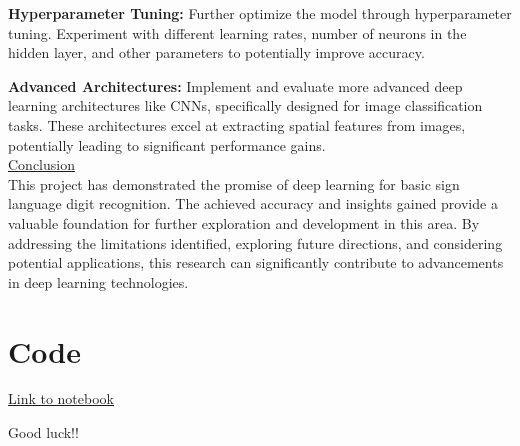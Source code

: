 \documentclass{article}
\begin{document}
\textbf{Hyperparameter Tuning:} Further optimize the model through hyperparameter tuning. Experiment with different learning rates, number of neurons in the hidden layer, and other parameters to potentially improve accuracy.

\textbf{Advanced Architectures:} Implement and evaluate more advanced deep learning architectures like CNNs, specifically designed for image classification tasks. These architectures excel at extracting spatial features from images, potentially leading to significant performance gains. \\


\underline{Conclusion} \\
This project has demonstrated the promise of deep learning for basic sign language digit recognition. The achieved accuracy and insights gained provide a valuable foundation for further exploration and development in this area. By addressing the limitations identified, exploring future directions, and considering potential applications, this research can significantly contribute to advancements in deep learning technologies.

\section{Code}
\href{https://colab.research.google.com/drive/17l2Hzcw9iYNcaJ6eD4uKhlNWUl5fsWA1?usp=sharing}{Link to notebook}

\nocite{*} 

Good luck!!


\end{document}

